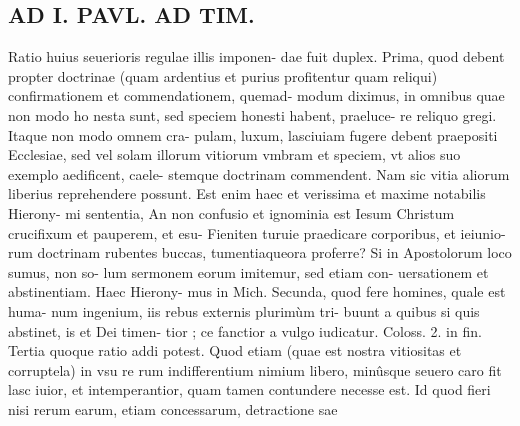 \documentclass{article}
\begin{document}
\begin{pages}
\section*{AD I. PAVL. AD TIM. }
\marginpar{[ p.372 ]}\pstart Ratio huius seuerioris regulae illis imponen- dae fuit duplex.  \pend\pstart Prima, quod debent propter doctrinae (quam ardentius et purius profitentur quam reliqui) confirmationem et commendationem, quemad- modum diximus, in omnibus quae non modo ho nesta sunt, sed speciem honesti habent, praeluce- re reliquo gregi. Itaque non modo omnem cra- pulam, luxum, lasciuiam fugere debent praepositi Ecclesiae, sed vel solam illorum vitiorum vmbram et speciem, vt alios suo exemplo aedificent, caele- stemque doctrinam commendent. Nam sic vitia aliorum liberius reprehendere possunt. Est enim haec et verissima et maxime notabilis Hierony- mi sententia, An non confusio et ignominia est Iesum Christum crucifixum et pauperem, et esu- Fieniten turuie praedicare corporibus, et ieiunio- rum doctrinam rubentes buccas, tumentiaqueora proferre? Si in Apostolorum loco sumus, non so- lum sermonem eorum imitemur, sed etiam con- uersationem et abstinentiam. Haec Hierony- mus in Mich.  \pend\pstart Secunda, quod fere homines, quale est huma- num ingenium, iis rebus externis plurimùm tri- buunt a quibus si quis abstinet, is et Dei timen- tior ; ce fanctior a vulgo iudicatur. Coloss. 2. in fin.  \pend\pstart Tertia quoque ratio addi potest. Quod etiam (quae est nostra vitiositas et corruptela) in vsu re rum indifferentium nimium libero, minûsque seuero caro fit lasc iuior, et intemperantior, quam tamen contundere necesse est. Id quod fieri nisi rerum earum, etiam concessarum, detractione sae  \pend

\end{pages}
\end{document}
